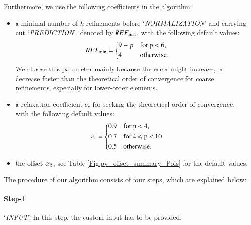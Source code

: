 \documentclass[review,3p]{elsarticle}
\begin{document}
Furthermore, we use the following coefficients in the algorithm:		%
\begin{itemize}
  \renewcommand\labelitemi{--}
  \item a minimal number of $h$-refinements before `\textit{NORMALIZATION}' and carrying out `\textit{PREDICTION}', denoted by $REF_{\rm min}$, with the following default values:
  \begin{equation}
  \begin{aligned}
      REF_{\rm min} &=
      \begin{cases*}
	9-p & for p $<$ 6, \\
	4 & otherwise.
      \end{cases*}
  \end{aligned}
  \end{equation} 
  We choose this parameter mainly because the error might increase, or decrease faster than the theoretical order of convergence for coarse refinements, especially for lower-order elements.
  \item a relaxation coefficient $c_r$ for seeking the theoretical order of convergence, with the following default values: 
    \begin{equation}
    \begin{aligned}
	c_r &=
	\begin{cases*}
	  0.9 & for p $<$ 4, \\
	  0.7 & for 4 $\leqslant$ p $<$ 10, \\
	  0.5 & otherwise.
	\end{cases*}
    \end{aligned}
    \end{equation}
  \item the offset $\alpha _{\rm R}$, see Table \ref{Fig:py_offset_summary_Pois} for the default values.
\end{itemize}

The procedure of our algorithm consists of four steps, which are explained below:

\paragraph{Step-1} `\textit{INPUT}'. In this step, the custom input has to be provided.
\end{document}
